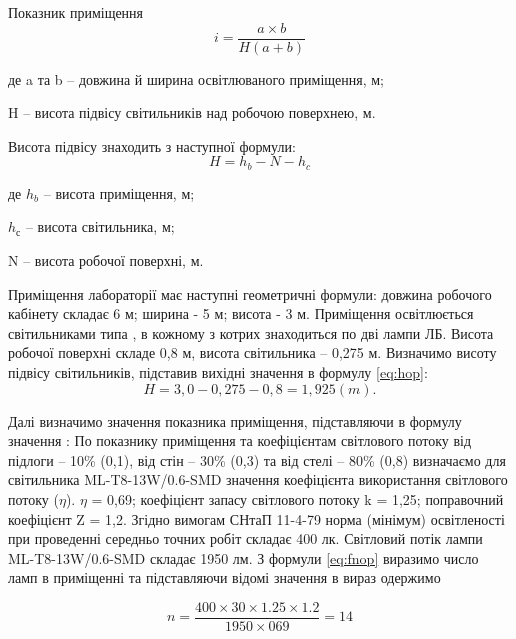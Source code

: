 \documentclass[ukrainian,utf8,simple,floatsingle,hpadding=5mm]{eskdtext}
\begin{document}
Показник  приміщення
\begin{equation}
\label{eq:iop}
 i = \frac{a \times b}{H(a+b)}
\end{equation}
\begin{ESKDexplanation}
  \item де a та b – довжина й ширина освітлюваного приміщення, м;  
  \item H – висота підвісу світильників над робочою поверхнею, м.
\end{ESKDexplanation}

Висота підвісу знаходить з наступної формули:
\begin{equation}
\label{eq:hop}
 H =h_{b} - N - h_{c} 
\end{equation}   
\begin{ESKDexplanation}
\item де $h_{b}$ – висота приміщення, м;
\item $h_{с}$ – висота світильника, м;
\item N – висота робочої поверхні, м.
\end{ESKDexplanation}
Приміщення лабораторії має наступні геометричні формули: довжина робочого кабінету складає 6 м;
ширина - 5 м; висота - 3 м.
Приміщення освітлюється світильниками типа , в кожному з котрих знаходиться по дві лампи ЛБ. 
Висота робочої поверхні складе 0,8 м, висота світильника – 0,275 м.
Визначимо висоту підвісу світильників, підставив вихідні значення в формулу \ref{eq:hop}:
\begin{equation}
 H =   3,0 - 0,275 - 0,8 = 1,925(m).
\end{equation}            

Далі визначимо значення показника приміщення, підставляючи в формулу значення :       
По показнику приміщення та коефіцієнтам світлового потоку від підлоги – 10\% (0,1), від стін – 30\% (0,3) та від стелі – 80\% (0,8)
визначаємо для світильника ML-T8-13W/0.6-SMD значення коефіцієнта використання світлового потоку ($\eta$). $\eta$ = 0,69; 
коефіцієнт запасу світлового потоку k = 1,25; поправочний коефіцієнт Z = 1,2.
Згідно вимогам СНтаП 11-4-79 норма (мінімум) освітленості при проведенні середньо точних робіт складає 400 лк.
Світловий потік лампи ML-T8-13W/0.6-SMD складає 1950 лм.
З формули \ref{eq:fnop} виразимо число ламп в приміщенні та підставляючи відомі значення в вираз одержимо
 
\begin{equation}
 n = \frac{400 \times 30 \times 1.25 \times 1.2 }{1950 \times 069} = 14
\end{equation}
\end{document}
